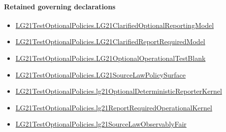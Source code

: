 \documentclass[10pt]{article}
\begin{document}
\paragraph{Retained governing declarations}
\begin{itemize}\raggedright
\item \hyperlink{governing-declaration-2b174af5c6fd50a6}{LG21\allowbreak{}Test\allowbreak{}Optional\allowbreak{}Policies.\allowbreak{}LG21\allowbreak{}Clarified\allowbreak{}Optional\allowbreak{}Reporting\allowbreak{}Model}
\item \hyperlink{governing-declaration-7724598115a85bb3}{LG21\allowbreak{}Test\allowbreak{}Optional\allowbreak{}Policies.\allowbreak{}LG21\allowbreak{}Clarified\allowbreak{}Report\allowbreak{}Required\allowbreak{}Model}
\item \hyperlink{governing-declaration-e7b17ecf1edeb27a}{LG21\allowbreak{}Test\allowbreak{}Optional\allowbreak{}Policies.\allowbreak{}LG21\allowbreak{}Optional\allowbreak{}Operational\allowbreak{}Test\allowbreak{}Blank}
\item \hyperlink{governing-declaration-48965123e52b8b0f}{LG21\allowbreak{}Test\allowbreak{}Optional\allowbreak{}Policies.\allowbreak{}LG21\allowbreak{}Source\allowbreak{}Law\allowbreak{}Policy\allowbreak{}Surface}
\item \hyperlink{governing-declaration-1d22dcbaf5c495df}{LG21\allowbreak{}Test\allowbreak{}Optional\allowbreak{}Policies.\allowbreak{}lg21\allowbreak{}Optional\allowbreak{}Deterministic\allowbreak{}Reporter\allowbreak{}Kernel}
\item \hyperlink{governing-declaration-2d3337b005590c6c}{LG21\allowbreak{}Test\allowbreak{}Optional\allowbreak{}Policies.\allowbreak{}lg21\allowbreak{}Report\allowbreak{}Required\allowbreak{}Operational\allowbreak{}Kernel}
\item \hyperlink{paper-prerequisite-a01f7afb43c09d7e}{LG21\allowbreak{}Test\allowbreak{}Optional\allowbreak{}Policies.\allowbreak{}lg21\allowbreak{}Source\allowbreak{}Law\allowbreak{}Observably\allowbreak{}Fair}
\end{itemize}
\end{document}
